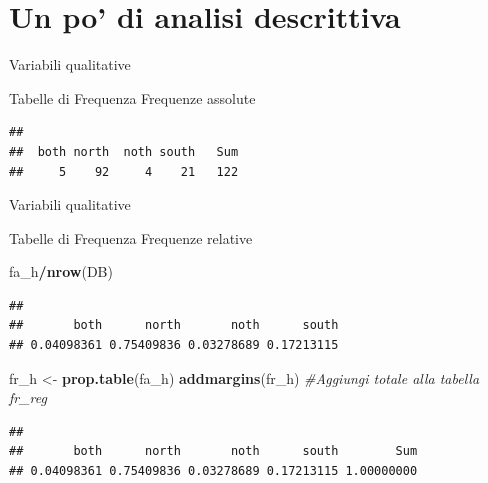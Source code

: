 \documentclass[
  ignorenonframetext,
]{beamer}
\newenvironment{Shaded}{\begin{snugshade}}{\end{snugshade}}
\newcommand{\CommentTok}[1]{\textcolor[rgb]{0.56,0.35,0.01}{\textit{#1}}}
\newcommand{\KeywordTok}[1]{\textcolor[rgb]{0.13,0.29,0.53}{\textbf{#1}}}
\newcommand{\NormalTok}[1]{#1}
\newcommand{\OperatorTok}[1]{\textcolor[rgb]{0.81,0.36,0.00}{\textbf{#1}}}
\newcommand{\StringTok}[1]{\textcolor[rgb]{0.31,0.60,0.02}{#1}}
\begin{document}
\hypertarget{un-po-di-analisi-descrittiva}{%
\section{Un po' di analisi
descrittiva}\label{un-po-di-analisi-descrittiva}}

\begin{frame}[fragile]{Variabili qualitative}
\protect\hypertarget{variabili-qualitative}{}
\begin{block}{Tabelle di Frequenza}
\protect\hypertarget{tabelle-di-frequenza}{}
Frequenze assolute

\begin{Shaded}
\end{Shaded}

\begin{verbatim}
## 
##  both north  noth south   Sum 
##     5    92     4    21   122
\end{verbatim}
\end{block}
\end{frame}

\begin{frame}[fragile]{Variabili qualitative}
\protect\hypertarget{variabili-qualitative-1}{}
\begin{block}{Tabelle di Frequenza}
\protect\hypertarget{tabelle-di-frequenza-1}{}
Frequenze relative

\begin{Shaded}
\begin{Highlighting}[]
\NormalTok{fa\_h}\OperatorTok{/}\KeywordTok{nrow}\NormalTok{(DB)}
\end{Highlighting}
\end{Shaded}

\begin{verbatim}
## 
##       both      north       noth      south 
## 0.04098361 0.75409836 0.03278689 0.17213115
\end{verbatim}

\begin{Shaded}
\begin{Highlighting}[]
\NormalTok{fr\_h \textless{}{-}}\StringTok{ }\KeywordTok{prop.table}\NormalTok{(fa\_h)}
\KeywordTok{addmargins}\NormalTok{(fr\_h) }\CommentTok{\#Aggiungi totale alla tabella fr\_reg}
\end{Highlighting}
\end{Shaded}

\begin{verbatim}
## 
##       both      north       noth      south        Sum 
## 0.04098361 0.75409836 0.03278689 0.17213115 1.00000000
\end{verbatim}
\end{block}
\end{frame}
\end{document}
